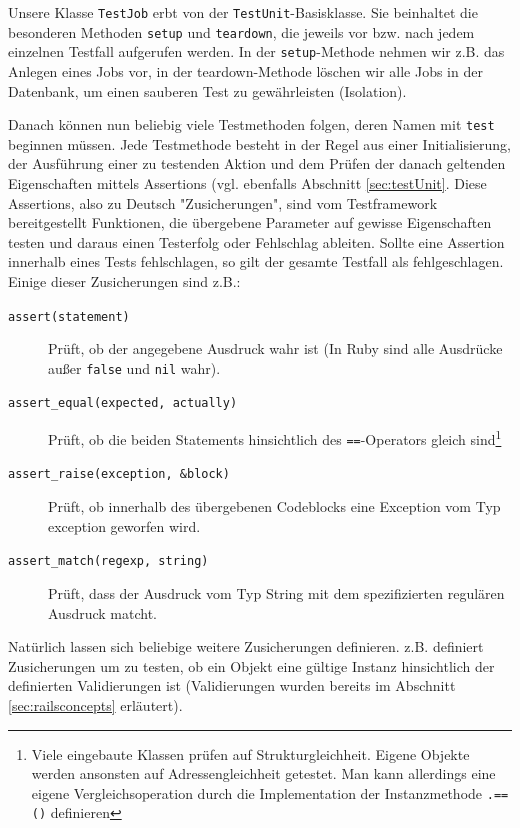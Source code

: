 Unsere Klasse \texttt{TestJob} erbt von der \texttt{TestUnit}-Basisklasse. Sie beinhaltet die besonderen Methoden \texttt{setup} und \texttt{teardown}, die jeweils vor bzw. nach jedem einzelnen Testfall aufgerufen werden.
In der \texttt{setup}-Methode nehmen wir z.B. das Anlegen eines Jobs vor, in der teardown-Methode löschen wir alle Jobs in der Datenbank, um einen sauberen Test zu gewährleisten (Isolation).

Danach können nun beliebig viele Testmethoden folgen, deren Namen mit \texttt{test} beginnen müssen.
Jede Testmethode besteht in der Regel aus einer Initialisierung, der Ausführung einer zu testenden Aktion und dem Prüfen der danach geltenden Eigenschaften mittels Assertions (vgl. ebenfalls Abschnitt \ref{sec:testUnit}. Diese Assertions, also zu Deutsch "Zusicherungen", sind vom Testframework bereitgestellt Funktionen, die übergebene Parameter auf gewisse Eigenschaften testen und daraus einen Testerfolg oder Fehlschlag ableiten. Sollte eine Assertion innerhalb eines Tests fehlschlagen, so gilt der gesamte Testfall als fehlgeschlagen. \\
Einige dieser Zusicherungen sind z.B.:
\begin{description}
 \item[\texttt{assert(statement)}] Prüft, ob der angegebene Ausdruck wahr ist (In Ruby sind alle Ausdrücke außer \texttt{false} und \texttt{nil} wahr).
 \item[\texttt{assert\_equal(expected, actually)}] Prüft, ob die beiden Statements hinsichtlich des \texttt{==}-Operators gleich sind\footnote{Viele eingebaute Klassen prüfen auf Strukturgleichheit. Eigene Objekte werden ansonsten auf Adressengleichheit getestet. Man kann allerdings eine eigene Vergleichsoperation durch die Implementation der Instanzmethode \texttt{.==()} definieren}

 \item[\texttt{assert\_raise(exception, \&block)}] Prüft, ob innerhalb des übergebenen Codeblocks eine Exception vom Typ exception geworfen wird.
 \item[\texttt{assert\_match(regexp, string)}] Prüft, dass der Ausdruck vom Typ String mit dem spezifizierten regulären Ausdruck matcht.
\end{description}
Natürlich lassen sich beliebige weitere Zusicherungen definieren.  z.B. definiert Zusicherungen um zu testen, ob ein Objekt eine gültige Instanz hinsichtlich der definierten Validierungen ist (Validierungen wurden bereits im Abschnitt \ref{sec:railsconcepts} erläutert).


